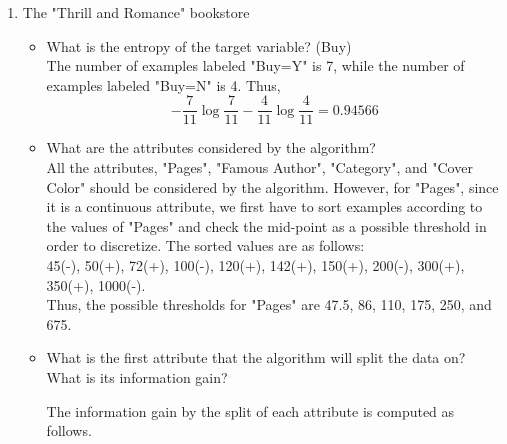 \begin{enumerate}
\item The "Thrill and Romance" bookstore

\begin{itemize}
\item What is the entropy of the target variable? (Buy)\\
The number of examples labeled "Buy=Y" is 7, while the number of examples labeled "Buy=N" is 4. Thus,
\[
-\frac{7}{11}\log \frac{7}{11}-\frac{4}{11}\log \frac{4}{11}=0.94566
\]

\item What are the attributes considered by the algorithm?\\
All the attributes, "Pages", "Famous Author", "Category", and "Cover Color" should be considered by the algorithm. However, for "Pages", since it is a continuous attribute, we first have to sort examples according to the values of "Pages" and check the mid-point as a possible threshold in order to discretize. The sorted values are as follows:\\
45(-), 50(+), 72(+), 100(-), 120(+), 142(+), 150(+), 200(-), 300(+), 350(+), 1000(-).\\
Thus, the possible thresholds for "Pages" are 47.5, 86, 110, 175, 250, and 675. 

\item What is the first attribute that the algorithm will split the data on? What is its information gain?

The information gain by the split of each attribute is computed as follows.


\end{itemize}
\end{enumerate}
